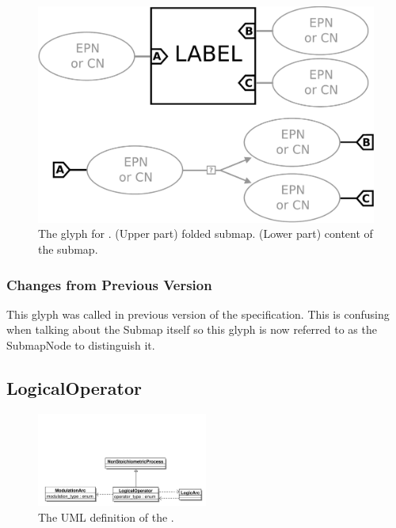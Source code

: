 \begin{figure}[H]
  \centering
  \includegraphics[scale = 0.22]{images/submap}
  \caption{The \PD glyph for . (Upper part) folded submap. (Lower part) content of the submap.}
  \label{fig:submap}
\end{figure}

\subsubsection{Changes from Previous Version}

This glyph was called  in previous version of the \PD
specification. This is confusing when talking about the Submap itself
so this glyph is now referred to as the SubmapNode to distinguish it.

\subsection{LogicalOperator}
\label{sec:logic}
\label{defn:LogicalOperator}

\begin{figure}[htb]
  \centering
  \includegraphics[width = 0.5\textwidth]{images/logicaloperatoruml}
  \caption{The UML definition of the .}
  \label{fig:logicaloperatoruml}
\end{figure}

